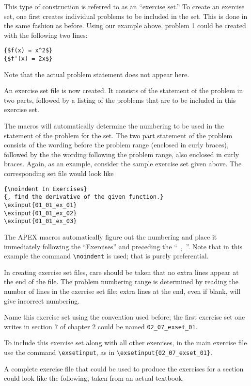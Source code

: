 \documentclass[10pt]{article}
\begin{document}
This type of construction is referred to as an ``exercise set.'' To create an exercise set, one first creates individual problems to be included in the set. This is done in the same fashion as before. Using our example above, problem 1 could be created with the following two lines:
\begin{verbatim}
{$f(x) = x^2$}
{$f'(x) = 2x$}
\end{verbatim}
Note that the actual problem statement does not appear here.

An exercise set file is now created. It consists of the statement of the problem in two parts, followed by a listing of the problems that are to be included in this exercise set.

The macros will automatically determine the numbering to be used in the statement of the problem for the set. The two part statement of the problem consists of the wording before the problem range (enclosed in curly braces), followed by the the wording following the problem range, also enclosed in curly braces. Again, as an example, consider the sample exercise set given above. The corresponding set file would look like
\begin{verbatim}
{\noindent In Exercises}
{, find the derivative of the given function.}
\exinput{01_01_ex_01}
\exinput{01_01_ex_02}
\exinput{01_01_ex_03}
\end{verbatim}

The APEX macros automatically figure out the numbering and place it immediately following the ``Exercises'' and preceding the ``\ ,\ ''. Note that in this example the command \verb|\noindent| is used; that is purely preferential. 

In creating exercise set files, care should be taken that no extra lines appear at the end of the file. The problem numbering range is determined by reading the number of lines in the exercise set file; extra lines at the end, even if blank, will give incorrect numbering.

Name this exercise set using the convention used before; the first exercise set one writes in section 7 of chapter 2 could be named \verb|02_07_exset_01|. 

To include this exercise set along with all other exercises, in the main exercise file use the command \verb|\exsetinput|, as in \verb|\exsetinput{02_07_exset_01}|.

A complete exercise file that could be used to produce the exercises for a section could look like the following, taken from an actual textbook.
\end{document}
